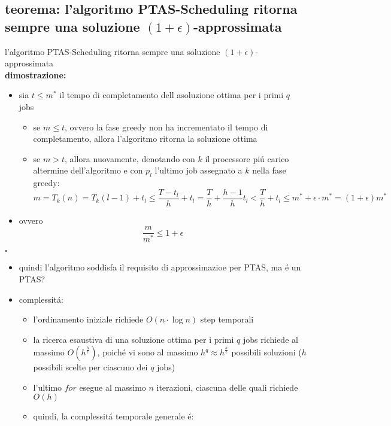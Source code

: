 \subsection*{teorema: l'algoritmo PTAS-Scheduling ritorna sempre una soluzione $(1+\epsilon)$-approssimata} 
\begin{flushleft}
	l'algoritmo PTAS-Scheduling ritorna sempre una soluzione $(1+\epsilon)$-approssimata \newline \\
	\textbf{dimostrazione:}
	\begin{itemize}
		\item sia $t\leq m^*$ il tempo di completamento dell asoluzione ottima per i primi $q$ jobs
		\begin{itemize}
			\item se $m\leq t$, ovvero la fase greedy non ha incrementato il tempo di completamento, allora l'algoritmo ritorna la soluzione ottima
			\item se $m>t$, allora nuovamente, denotando con $k$ il processore pi\'u carico altermine dell'algoritmo e con $p_l$ l'ultimo job assegnato a $k$ nella fase greedy:
				$$m=T_k(n)=T_k(l-1)+t_l\leq\frac{T-t_l}{h}+t_l=\frac{T}{h}+\frac{h-1}{h}t_l<\frac{T}{h}+t_l\leq m^*+\epsilon\cdot m^*=(1+\epsilon)m^*$$
		\end{itemize}
		\item ovvero
			$$\frac{m}{m^*}\leq 1+\epsilon$$
	\end{itemize}
	\hfill$\square$
	\begin{itemize}
		\item quindi l'algoritmo soddisfa il requisito di approssimazioe per PTAS, ma \'e un PTAS?
		\item complessit\'a:
		\begin{itemize}
			\item l'ordinamento iniziale richiede $O(n\cdot\log n)$ step temporali
			\item la ricerca esaustiva di una soluzione ottima per i primi $q$ jobs richiede al massimo $O(h^\frac{h}{\epsilon})$, poich\'e vi sono al  massimo $h^q\approx h^\frac{h}{\epsilon}$ possibili soluzioni ($h$ possibili scelte per ciascuno dei $q$ jobs)
			\item l'ultimo $for$ esegue al massimo $n$ iterazioni, ciascuna delle quali richiede $O(h)$
			\item quindi, la complessit\'a temporale generale \'e:

\end{itemize}
\end{itemize}
\end{flushleft}

